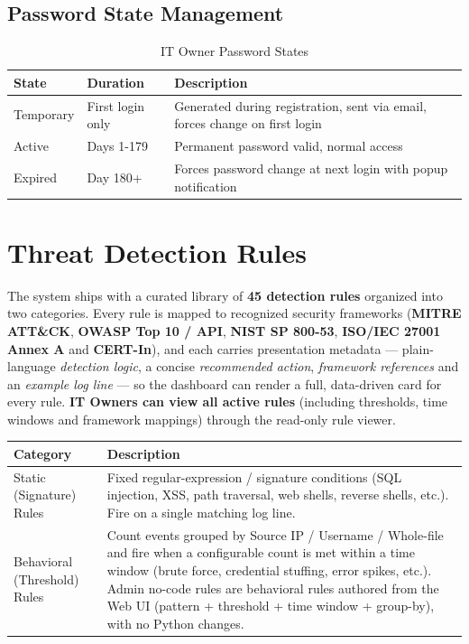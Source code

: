 \documentclass[12pt,a4paper]{article}
\begin{document}
\subsection{Password State Management}

\begin{table}[H]
\centering
\begin{tabular}{|p{3cm}|p{4cm}|p{7cm}|}
\hline
\textbf{State} & \textbf{Duration} & \textbf{Description} \\
\hline
Temporary & First login only & Generated during registration, sent via email, forces change on first login \\
\hline
Active & Days 1-179 & Permanent password valid, normal access \\
\hline
Expired & Day 180+ & Forces password change at next login with popup notification \\
\hline
\end{tabular}
\caption{IT Owner Password States}
\label{tab:password-states}
\end{table}


\section{Threat Detection Rules}

The system ships with a curated library of \textbf{45 detection rules} organized into two
categories. Every rule is mapped to recognized security frameworks
(\textbf{MITRE ATT\&CK}, \textbf{OWASP Top 10 / API}, \textbf{NIST SP 800-53},
\textbf{ISO/IEC 27001 Annex A} and \textbf{CERT-In}), and each carries presentation
metadata --- plain-language \emph{detection logic}, a concise \emph{recommended action},
\emph{framework references} and an \emph{example log line} --- so the dashboard can render a
full, data-driven card for every rule. \textbf{IT Owners can view all active rules}
(including thresholds, time windows and framework mappings) through the read-only rule viewer.

\begin{table}[H]
\centering
\begin{tabular}{|p{3.4cm}|p{11.1cm}|}
\hline
\textbf{Category} & \textbf{Description} \\
\hline
Static (Signature) Rules & Fixed regular-expression / signature conditions (SQL injection, XSS, path traversal, web shells, reverse shells, etc.). Fire on a single matching log line. \\
\hline
Behavioral (Threshold) Rules & Count events grouped by Source IP / Username / Whole-file and fire when a configurable count is met within a time window (brute force, credential stuffing, error spikes, etc.). Admin no-code rules are behavioral rules authored from the Web UI (pattern + threshold + time window + group-by), with no Python changes. \\
\hline
\end{tabular}
\label{tab:rule-categories}
\end{table}
\end{document}
